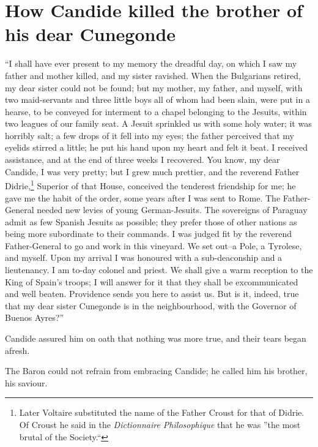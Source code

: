 \vspace{1cm}
\begingroup
\let\clearpage\relax
\chapter{How Candide killed the brother of his dear Cunegonde}
\thispagestyle{pter}
\endgroup
\vspace{-1cm}
\lettrine[lraise=0.1,nindent=0em,slope=-.5em]{``I}{} shall have ever present to my memory the dreadful day, on which I saw my father and mother killed, and my sister ravished. When the Bulgarians retired, my dear sister could not be found; but my mother, my father, and myself, with two maid-servants and three little boys all of whom had been slain, were put in a hearse, to be conveyed for interment to a chapel belonging to the Jesuits, within two leagues of our family seat. A Jesuit sprinkled us with some holy water; it was horribly salt; a few drops of it fell into my eyes; the father perceived that my eyelids stirred a little; he put his hand upon my heart and felt it beat. I received assistance, and at the end of three weeks I recovered. You know, my dear Candide, I was very pretty; but I grew much prettier, and the reverend Father Didrie,\footnote{Later Voltaire substituted the name of the Father Croust for that of Didrie. Of Croust he said in the \textit{Dictionnaire Philosophique} that he was ''the most brutal of the Society.``} Superior of that House, conceived the tenderest friendship for me; he gave me the habit of the order, some years after I was sent to Rome. The Father-General needed new levies of young German-Jesuits. The sovereigns of Paraguay admit as few Spanish Jesuits as possible; they prefer those of other nations as being more subordinate to their commands. I was judged fit by the reverend Father-General to go and work in this vineyard. We set out--a Pole, a Tyrolese, and myself. Upon my arrival I was honoured with a sub-deaconship and a lieutenancy. I am to-day colonel and priest. We shall give a warm reception to the King of Spain's troops; I will answer for it that they shall be excommunicated and well beaten. Providence sends you here to assist us. But is it, indeed, true that my dear sister Cunegonde is in the neighbourhood, with the Governor of Buenos Ayres?''

Candide assured him on oath that nothing was more true, and their tears began afresh.

The Baron could not refrain from embracing Candide; he called him his brother, his saviour.

